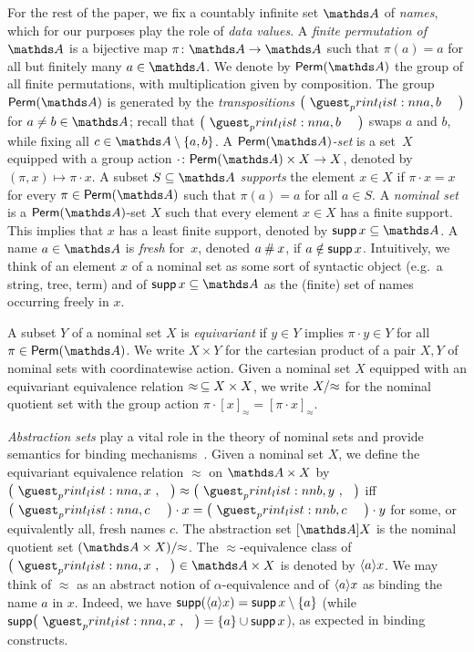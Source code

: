 \documentclass[a4paper,UKenglish,cleveref,autoref,thm-restate,numberwithinsect,final]{lipics-v2021}
\begin{document}
    For the rest of the paper, we fix a countably infinite set $\names$ of \emph{names}, which for our purposes play the role of \emph{data values}. A \emph{finite permutation of $\names$} is a bijective map $\pi\colon \names\to\names$ such that $\pi(a) = a$ for all but finitely many $a\in \names$.
    We denote by $\Perm(\names)$ the group of all {finite permutations}, with multiplication given by composition.
    The group $\Perm(\names)$ is generated by the \emph{transpositions} $\makecycle{a, b}$ for $a \neq b \in \names$; recall that $\makecycle{a, b}$ swaps $a$ and $b$, while fixing all $c\in \names\setminus \set{a, b}$.
    A \emph{$\Perm(\names)$-set} is a set~$X$ equipped with a group action $\cdot\colon \Perm(\names) \times X \to X$,
    denoted by $(\pi,x)\mapsto \pi\cdot x$. A subset $S\seq \names$ \emph{supports} the element $x\in X$ if $\pi \cdot x = x$ for every
    $\pi\in\Perm(\names)$ such that $\pi(a) = a$ for all $a \in S$. A \emph{nominal set} is a $\Perm(\names)$-set $X$ such that every element $x\in X$ has a finite support.
    This implies that $x$ has a least finite support, denoted by $\supp x \seq \names$. A name $a \in \names$ is \emph{fresh} for~$x$, denoted $a \mathbin{\#} x$, if $a \notin \operatorname{\mathsf{supp}} x$. Intuitively, we think of an element $x$ of a nominal set as some sort of syntactic object (e.g.~a string, tree, term) and of $\supp x\seq \names$ as the (finite) set of names occurring freely in $x$.

A subset $Y$ of a nominal set $X$ is \emph{equivariant} if $y\in Y$ implies $\pi\cdot y\in Y$ for all $\pi\in\Perm(\names)$. We write $X\times Y$ for the cartesian product of a pair $X,Y$ of nominal sets with coordinatewise action. Given a nominal set $X$ equipped with an equivariant equivalence relation $\approx\,\subseteq X\times X$, we write ${X}/{\approx}$ for the nominal quotient set with the group action $\pi \cdot [x]_\approx = [\pi\cdot x]_\approx$.

    \emph{Abstraction sets} play a vital role in the theory of nominal sets and provide semantics for binding mechanisms~\cite{gp99}.
    Given a nominal set $X$, we define the equivariant equivalence relation $\approx$ on $\names \times X$ by $\maketuple{a,x} \approx \maketuple{b,y}$ iff $\makecycle{a,c} \cdot x=\makecycle{b,c} \cdot y$ for some, or equivalently all, fresh names $c$.
    The abstraction set $\Abstr{X}$ is the nominal quotient set $\quotient{(\names\times X)}{\approx}$. The $\approx$-equivalence
    class of $\maketuple{a,x} \in \names \times X$ is denoted by $\langle a \rangle x$.
    We may think of $\approx$ as an abstract notion of $\alpha$-equivalence and of $\langle a \rangle x$ as binding the name $a$ in $x$.
    Indeed, we have $\operatorname{\mathsf{supp}}(\langle a \rangle x) = \operatorname{\mathsf{supp}} x \setminus \{a\}$ (while $\supp\maketuple{a,x} = \set{a} \cup \supp x$), as expected in binding constructs.
\end{document}
